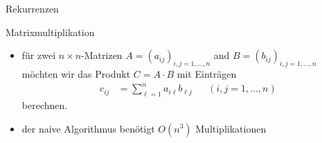 \documentclass[aspectratio=1610, 11pt]{beamer}
\begin{document}
\begin{frame}{Rekurrenzen}
	\begin{exampleblock}{Matrixmultiplikation}
		\begin{itemize}
			\item f\"ur zwei $n\times n$-Matrizen $A=(a_{ij})_{i,j=1,\ldots,n}$ and $B=(b_{ij})_{i,j=1,\ldots,n}$ m\"ochten wir das Produkt $C=A\cdot B$ mit Eintr\"agen
				\begin{align*}
					c_{ij}&=\sum_{\ell=1}^na_{i\ell}b_{\ell j}&&(i,j=1,\ldots,n)
				\end{align*}
				berechnen.
			\item der naive Algorithmus ben\"otigt $O(n^3)$ Multiplikationen
		\end{itemize}
	\end{exampleblock}
\end{frame}
\end{document}
